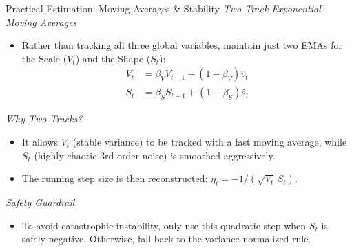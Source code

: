 \documentclass[9pt]{beamer}
\begin{document}
\begin{frame}{Practical Estimation: Moving Averages \& Stability}
    \emph{Two-Track Exponential Moving Averages }
    \begin{itemize}
        \item Rather than tracking all three global variables, maintain just two EMAs for the Scale ($V_t$) and the Shape ($S_t$):
        \begin{align*}
            V_t &= \beta_V V_{t-1} + (1-\beta_V)\hat{v}_t \\
            S_t &= \beta_S S_{t-1} + (1-\beta_S)\hat{s}_t
        \end{align*}
    \end{itemize}

    \vspace{0.2em}
    \emph{Why Two Tracks?}
    \begin{itemize}
        \item It allows $V_t$ (stable variance) to be tracked with a fast moving average, while $S_t$ (highly chaotic 3rd-order noise) is smoothed aggressively.
        \item The running step size is then reconstructed: $\eta_t = -1 / (\sqrt{V_t}\,S_t)$.
    \end{itemize}

    \vspace{0.5em}
    \emph{Safety Guardrail}
    \begin{itemize}
        \item To avoid catastrophic instability, only use this quadratic step when $S_t$ is safely negative. Otherwise, fall back to the variance-normalized rule.
    \end{itemize}
\end{frame}
\end{document}
